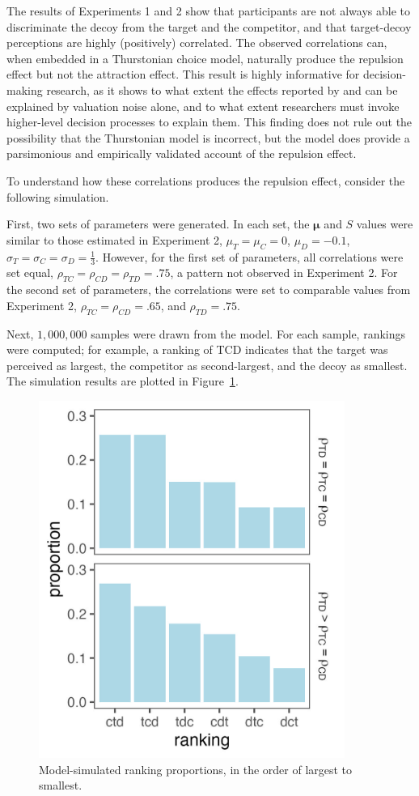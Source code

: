 The results of Experiments 1 and 2 show that participants are not always able to discriminate the decoy from the target and the competitor, and that target-decoy perceptions are highly (positively) correlated. The observed correlations can, when embedded in a Thurstonian choice model, naturally produce the repulsion effect but not the attraction effect. This result is highly informative for decision-making research, as it shows to what extent the effects reported by \textcite{trueblood2013not} and \textcite{spektorWhenGoodLooks2018b} can be explained by valuation noise alone, and to what extent researchers must invoke higher-level decision processes to explain them. This finding does not rule out the possibility that the Thurstonian model is incorrect, but the model does provide a parsimonious and empirically validated account of the repulsion effect.

To understand how these correlations produces the repulsion effect, consider the following simulation. 

First, two sets of parameters were generated. In each set, the $\boldsymbol{\mu}$ and $S$ values were similar to those estimated in Experiment 2, $\mu_{T}=\mu_{C}=0$, $\mu_{D}=-0.1$, $\sigma_{T}=\sigma_{C}=\sigma_{D}=\frac{1}{3}$. However, for the first set of parameters, all correlations were set equal, $\rho_{TC}=\rho_{CD}=\rho_{TD}=.75$, a pattern not observed in Experiment 2. For the second set of parameters, the correlations were set to comparable values from Experiment 2, $\rho_{TC}=\rho_{CD}=.65$, and $\rho_{TD}=.75$. 

Next, $1,000,000$ samples were drawn from the model. For each sample, rankings were computed; for example, a ranking of TCD indicates that the target was perceived as largest, the competitor as second-largest, and the decoy as smallest. The simulation results are plotted in Figure~\ref{fig:sim_orderings}. 

\begin{figure}
   \centering
   \includegraphics[width=100mm]{figures/sim_mvnorm_rank.jpeg}
   \caption{Model-simulated ranking proportions, in the order of largest to smallest.}
   \label{fig:sim_orderings}
\end{figure}

